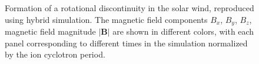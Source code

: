 \documentclass[
  letterpaper,
  DIV=11,
  numbers=noendperiod]{scrartcl}
\begin{document}
\begin{figure}


\caption{\label{fig-hybrid}Formation of a rotational discontinuity in the solar wind, reproduced using hybrid simulation. The magnetic field components \(B_x\), \(B_y\), \(B_z\), magnetic field magnitude \(|{\mathbf B}|\) are shown in different colors, with each panel corresponding to different times in the simulation normalized by the ion cyclotron period.}

\end{figure}%

\newpage{}





\end{document}
